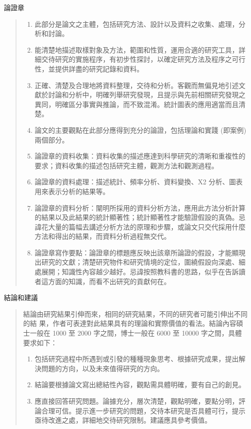 \documentclass[
    writingLanguage=chinese, %
    addPageTitle=on,  %
    addDeclaration=on, %
    addMUSTlog=off, %
    addFigTOC=on, %
    addTabTOC=on, %
    refIndent=off, %
    printMod=off, %
]{must}
\begin{document}
\noindent\faHandORight 論證章
\begin{quote}
\begin{enumerate}
    \item 此部分是論文之主體，包括研究方法、設計以及資料之收集、處理，分析和討論。
    \item  能清楚地描述取樣對象及方法，範圍和性質，運用合適的研究工具，詳細交待研究的實施程序，有初步性探討，以確定研究方法及程序之可行性，並提供詳盡的研究記錄和資料。
    \item  正確、清楚及合理地將資料整理，交待和分析。客觀而無偏見地引述文獻於討論和分析中，明確列舉研究發現，且提示與先前相關研究發現之異同，明確區分事實與推論，而不致混淆。統計圖表的應用適當而且清楚。
    \item 論文的主要觀點在此部分應得到充分的論證，包括理論和實踐 (即案例)兩個部分。
    \item 論證章的資料收集：資料收集的描述應達到科學研究的清晰和重複性的要求；資料收集的描述包括研究主體，觀測方法和觀測過程。
    \item 論證章的資料處理：描述統計、頻率分析、資料變換、X2 分析、圖表用來表示分析的結果等。
    \item 論證章的資料分析：闡明所採用的資料分析方法，應用此方法分析計算的結果以及此結果的統計顯著性；統計顯著性才能驗證假設的真偽。忌諱花大量的篇幅去講述分析方法的原理和步驟，或論文只交代採用什麼方法和得出的結果，而資料分析過程無交代。
  \item 論證章寫作要點：論證章的標題應反映出該章所論證的假設，才能顯現出研究的文獻；清楚研究物件和研究情境的定位，圍繞假設向深處、細處展開；知識性內容越少越好。忌諱按照教科書的思路，似乎在告訴讀者這方面的知識，而看不出研究的貢獻何在。
\end{enumerate}

\end{quote}

\noindent\faHandORight 結論和建議
\begin{quote}
結論由研究結果引伸而來，相同的研究結果，不同的研究者可能引伸出不同的結
果，作者可表達對此結果具有的理論和實際價值的看法。結論內容碩士一般在
1000 至 2000 字之間，博士一般在 6000 至 10000 字之間，具體要求如下：

\begin{enumerate}
    \item 包括研究過程中所遇到或引發的種種現象思考、根據研究成果，提出解決問題的方向，以及未來值得研究的方向。
    \item 結論要根據論文寫出總結性內容，觀點需具體明確，要有自己的創見。
    \item 應直接回答研究問題。論據充分，層次清楚，觀點明確，要點分明，評論合理可信。提示進一步研究的問題，交待本研究是否具體可行，提示亟待改進之處，詳細地交待研究限制。建議應具參考價值。
\end{enumerate}
\end{quote}
\end{document}
